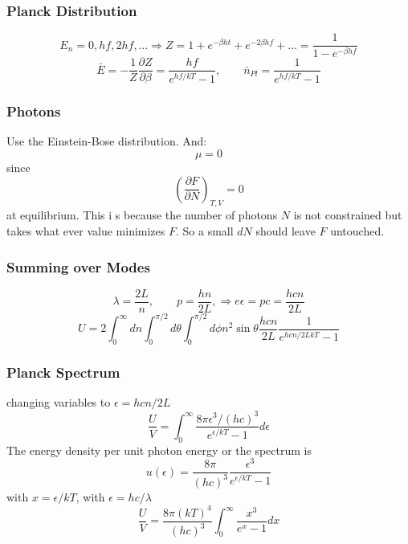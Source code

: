 \documentclass[a4paper,norsk, 10pt]{article}
\newcommand{\pd}[3]{\left(\frac{\partial #1}{\partial #2}\right)_{#3}}
\begin{document}
\subsubsection{Planck Distribution}
\begin{equation}
E_n = 0,hf,2hf,\ldots \Rightarrow Z = 1 + e^{-\beta ht} + e^{-2\beta hf}+ \ldots = \frac{1}{1-e^{-\beta hf}}
\end{equation}
\begin{equation}
\bar{E} = - \frac{1}{Z}\frac{\partial Z}{\partial \beta} = \frac{hf}{e^{hf/kT} - 1}, \qquad \bar{n}_{Pl} = \frac{1}{e^{hf/kT} - 1}
\end{equation}
\subsubsection{Photons}
Use the Einstein-Bose distribution. And:
\begin{equation}
\mu = 0
\end{equation}
since
\begin{equation}
\pd{F}{N}{T,V} = 0
\end{equation}
at equilibrium. This i s because the number of photons $N$ is not constrained but takes what ever value minimizes $F$. So a small $dN$ should leave $F$ untouched.
\subsubsection{Summing over Modes}
\begin{equation}
\lambda = \frac{2L}{n}, \qquad p = \frac{hn}{2L},\Rightarrow e\epsilon = pc = \frac{hcn}{2L}
\end{equation}
\begin{equation}
U = 2\int_0^{\infty}dn\int_0^{\pi/2}d\theta\int_0^{\pi/2}d\phi n^2\sin\theta \frac{hcn}{2L}\frac{1}{e^{hcn/2LkT}-1}
\end{equation}
\subsubsection{Planck Spectrum}
changing variables to $\epsilon = hcn/2L$
\begin{equation}
\frac{U}{V} = \int_0^\infty \frac{8\pi\epsilon^3/(hc)^3}{e^{\epsilon/kT}-1} d\epsilon
\end{equation}
The energy density per unit photon energy or the spectrum is
\begin{equation}
u(\epsilon) = \frac{8\pi}{(hc)^3}\frac{\epsilon^3}{e^{\epsilon/kT}-1}
\end{equation}
with $x = \epsilon/kT$, with $\epsilon = hc/\lambda$
\begin{equation}
\frac{U}{V} = \frac{8\pi(kT)^4}{(hc)^3}\int_0^\infty\frac{x^3}{e^x - 1} dx
\end{equation}
\end{document}

